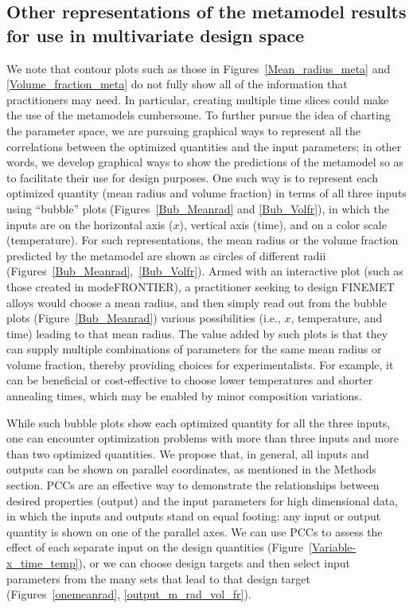 \subsection{Other representations of the metamodel results for use in multivariate design space}\label{result_PC_chart}
We note that contour plots such as those in Figures~\ref{Mean_radius_meta} and \ref{Volume_fraction_meta} do not fully show all
of the information that practitioners may need. In particular,  creating
 multiple time slices could make the use of the metamodels cumbersome.
 To further pursue the idea of charting the parameter space,
we are pursuing graphical ways to
represent all the correlations between the optimized quantities and the input parameters; in other words,
we develop graphical ways to show the predictions of the metamodel so as to facilitate their use for design purposes.
One such way is to represent each optimized quantity (mean radius and volume fraction) in terms of all  three
inputs using ``bubble'' plots (Figures~\ref{Bub_Meanrad} and \ref{Bub_Volfr}),
in which the inputs are on the horizontal axis ($x$), vertical axis (time), and on a color scale (temperature).
For such representations, the mean radius or the volume fraction predicted by the metamodel are shown as circles of different radii
(Figures~\ref{Bub_Meanrad},~\ref{Bub_Volfr}).  Armed with an interactive plot (such as those created in modeFRONTIER),
a practitioner seeking to design FINEMET alloys would choose a mean radius, and then simply read out from the bubble plots (Figure~\ref{Bub_Meanrad})
various possibilities (i.e., $x$, temperature, and time) leading to that mean radius.
The value added by such plots is that they can supply multiple combinations of parameters for the
same mean radius or volume fraction, thereby providing choices for experimentalists. For example,
it can be beneficial or cost-effective to choose lower temperatures and shorter annealing times, which may be enabled
by minor composition variations.



While such bubble plots show each optimized quantity for all the three inputs,
 one can encounter optimization problems with more than three inputs and more than
two optimized quantities. We propose that, in general, all inputs and outputs can be shown on parallel coordinates, as mentioned in the Methods section.
PCCs\cite{PCC} are an effective way to demonstrate the relationships between desired properties (output) and the input parameters for high dimensional data,
in which the inputs and outputs stand on equal footing: any input or output quantity is shown on one of the parallel axes.
We can use PCCs to assess the effect of each separate input on the design quantities (Figure~\ref{Variable-x_time_temp}), or we can choose
design targets  and then select input parameters from the many
sets that lead to that design target (Figures~\ref{onemeanrad}, \ref{output_m_rad_vol_fr}).


